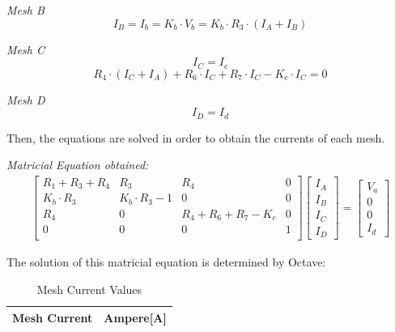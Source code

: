 \textit{Mesh B}
\begin{equation}
  I_B = I_b = K_b \cdot V_b = K_b \cdot R_3 \cdot (I_A + I_B)
  \label{eq:kvl2}
\end{equation}

\textit{Mesh C}
\begin{equation}
  I_C=I_c
  \label{eq:kvlaux}
\end{equation}
\begin{equation}
  R_4 \cdot (I_C + I_A) + R_6 \cdot I_C + R_7 \cdot I_C - K_c \cdot I_C = 0
  \label{eq:kvl3}
\end{equation}

\textit{Mesh D}
\begin{equation}
  I_D =I_d
  \label{eq:kvl4}
\end{equation}

Then, the equations are solved in order to obtain the currents of each mesh. \vspace {1cm}

\textit{Matricial Equation obtained:}
\begin{gather}
	\begin{bmatrix}
		R_1 + R_3 + R_4 & R_3 & R_4 & 0  \\
		K_b \cdot R_3 & K_b \cdot R_3 - 1& 0 & 0 \\
		R_4 & 0 & R_4 + R_6 + R_ 7 - K_c & 0 \\
		0 & 0 & 0 & 1 \\
	\end{bmatrix}
	\begin {bmatrix} I_A \\ I_B \\ I_C \\ I_D \end{bmatrix}
	=
	\begin {bmatrix} V_a \\ 0 \\ 0 \\ I_d \end{bmatrix}
\end{gather}

The solution of this matricial equation is determined by Octave:

\begin{table}[H]
  \centering
  \begin{tabular}{|l|r|}
    \hline    
    {\bf Mesh Current} & {\bf Ampere[A]} \\ \hline
    
  \end{tabular}
  \caption{Mesh Current Values}
  \label{tab:mesh}
\end{table}

